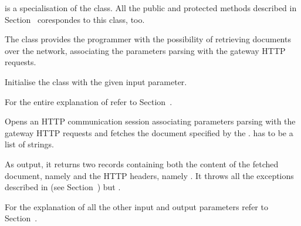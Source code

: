 \documentclass{ozdoc}
\begin{document}



 is a specialisation of the  class. All the public and protected methods described in Section~ corespondes to this class, too.

The  class provides the programmer with the possibility of retrieving documents over the network, associating the parameters parsing with the gateway  HTTP requests. \mozartEMPTY
 \mozartEMPTY
\begin{mozartDESCRIPTION}
\mozartENTRYHASCODE
\begin{mozartSYNOPSIS}
\begin{mozartCODEDISPLAY}\mozartFACETEXT{)}\end{mozartCODEDISPLAY}
\end{mozartSYNOPSIS}
\mozartITEM Initialise the class with the given  input parameter.

  \mozartEMPTY
For the entire explanation of  refer to Section~. \mozartEMPTY
{}\mozartENTRYHASCODE
\begin{mozartSYNOPSIS}
\begin{mozartCODEDISPLAY}\mozartFACETEXT{\mozartSPACE{}}\mozartFACETEXT{\mozartSPACE{}}\mozartFACETEXT{\mozartSPACE{}}\mozartFACETEXT{)}\end{mozartCODEDISPLAY}
\end{mozartSYNOPSIS}
\mozartITEM Opens an HTTP communication session associating  parameters parsing with the gateway  HTTP requests and fetches the document specified by the .  has to be a list of  strings.

As output, it returns two records containing both the content of the fetched document, namely  and the HTTP headers, namely . It throws all the exceptions described in (see Section~) but .

For the explanation of all the other input and output parameters refer to Section~. \mozartEMPTY
\end{mozartDESCRIPTION}
\end{document}
